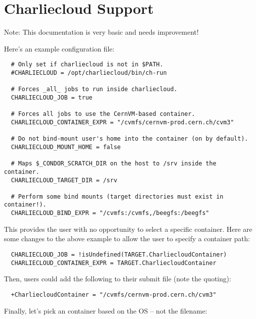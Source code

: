 \section{\label{sec:charliecloud-support}Charliecloud Support}


Note:  This documentation is very basic and needs improvement!

Here's an example configuration file:

\begin{verbatim}
  # Only set if charliecloud is not in $PATH.
  #CHARLIECLOUD = /opt/charliecloud/bin/ch-run

  # Forces _all_ jobs to run inside charliecloud.
  CHARLIECLOUD_JOB = true

  # Forces all jobs to use the CernVM-based container.
  CHARLIECLOUD_CONTAINER_EXPR = "/cvmfs/cernvm-prod.cern.ch/cvm3"

  # Do not bind-mount user's home into the container (on by default).
  CHARLIECLOUD_MOUNT_HOME = false

  # Maps $_CONDOR_SCRATCH_DIR on the host to /srv inside the container.
  CHARLIECLOUD_TARGET_DIR = /srv

  # Perform some bind mounts (target directories must exist in container!).
  CHARLIECLOUD_BIND_EXPR = "/cvmfs:/cvmfs,/beegfs:/beegfs"
\end{verbatim}

This provides the user with no opportunity to select a specific container.
Here are some changes to the above example to allow the user to specify a
container path:

\begin{verbatim}
  CHARLIECLOUD_JOB = !isUndefined(TARGET.CharliecloudContainer)
  CHARLIECLOUD_CONTAINER_EXPR = TARGET.CharliecloudContainer
\end{verbatim}

Then, users could add the following to their submit file
(note the quoting):

\begin{verbatim}
  +CharliecloudContainer = "/cvmfs/cernvm-prod.cern.ch/cvm3"
\end{verbatim}

Finally, let's pick an container based on the OS -- not the filename:

